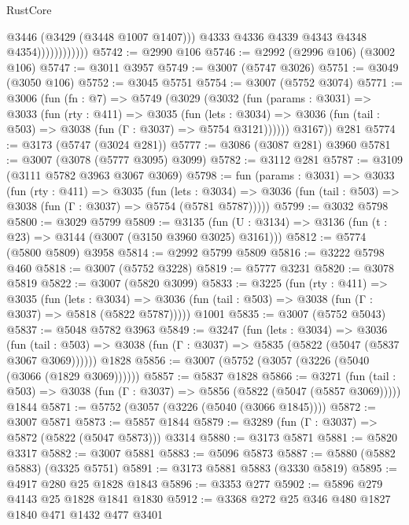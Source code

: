 \begin{lexlean}{RustCore}
\begin{coremodule}
                              @3446
                              (@3429 (@3448 @1007 @1407)))
                            @4333
                            @4336
                            @4339
                            @4343
                            @4348
                            @4354))))))))))))
@5742 := @2990 @106
@5746 := @2992 (@2996 @106) (@3002 @106)
@5747 := @3011 @3957
@5749 := @3007 (@5747 @3026)
@5751 := @3049 (@3050 @106)
@5752 := @3045 @5751
@5754 := @3007 (@5752 @3074)
@5771 := @3006
    (fun (fn : @7) =>
    @5749
      (@3029
        (@3032
          (fun (params : @3031) =>
          @3033
            (fun (rty : @411) =>
            @3035
              (fun (lets : @3034) =>
              @3036 (fun (tail : @503) => @3038 (fun (Γ : @3037) => @5754 @3121))))))
        @3167))
    @281
@5774 := @3173 (@5747 (@3024 @281))
@5777 := @3086 (@3087 @281) @3960
@5781 := @3007 (@3078 (@5777 @3095) @3099)
@5782 := @3112 @281
@5787 := @3109 (@3111 @5782 @3963 @3067 @3069)
@5798 := fun (params : @3031) =>
  @3033
    (fun (rty : @411) =>
    @3035
      (fun (lets : @3034) =>
      @3036 (fun (tail : @503) => @3038 (fun (Γ : @3037) => @5754 (@5781 @5787)))))
@5799 := @3032 @5798
@5800 := @3029 @5799
@5809 := @3135 (fun (U : @3134) => @3136 (fun (t : @23) => @3144 (@3007 (@3150 @3960 @3025) @3161)))
@5812 := @5774 (@5800 @5809) @3958
@5814 := @2992 @5799 @5809
@5816 := @3222 @5798 @460
@5818 := @3007 (@5752 @3228)
@5819 := @5777 @3231
@5820 := @3078 @5819
@5822 := @3007 (@5820 @3099)
@5833 := @3225
    (fun (rty : @411) =>
    @3035
      (fun (lets : @3034) =>
      @3036 (fun (tail : @503) => @3038 (fun (Γ : @3037) => @5818 (@5822 @5787)))))
    @1001
@5835 := @3007 (@5752 @5043)
@5837 := @5048 @5782 @3963
@5849 := @3247
    (fun (lets : @3034) =>
    @3036
      (fun (tail : @503) => @3038 (fun (Γ : @3037) => @5835 (@5822 (@5047 (@5837 @3067 @3069))))))
    @1828
@5856 := @3007 (@5752 (@3057 (@3226 (@5040 (@3066 (@1829 @3069))))))
@5857 := @5837 @1828
@5866 := @3271
    (fun (tail : @503) => @3038 (fun (Γ : @3037) => @5856 (@5822 (@5047 (@5857 @3069)))))
    @1844
@5871 := @5752 (@3057 (@3226 (@5040 (@3066 @1845))))
@5872 := @3007 @5871
@5873 := @5857 @1844
@5879 := @3289 (fun (Γ : @3037) => @5872 (@5822 (@5047 @5873))) @3314
@5880 := @3173 @5871
@5881 := @5820 @3317
@5882 := @3007 @5881
@5883 := @5096 @5873
@5887 := @5880 (@5882 @5883) (@3325 @5751)
@5891 := @3173 @5881 @5883 (@3330 @5819)
@5895 := @4917 @280 @25 @1828 @1843
@5896 := @3353 @277
@5902 := @5896 @279 @4143 @25 @1828 @1841 @1830
@5912 := @3368 @272 @25 @346 @480 @1827 @1840 @471 @1432 @477 @3401

\end{coremodule}
\end{lexlean}
